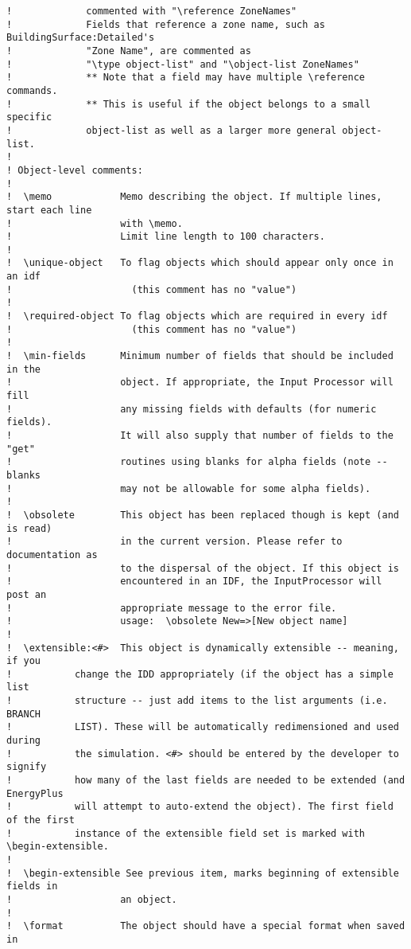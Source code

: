 \begin{lstlisting}
!             commented with "\reference ZoneNames"
!             Fields that reference a zone name, such as BuildingSurface:Detailed's
!             "Zone Name", are commented as
!             "\type object-list" and "\object-list ZoneNames"
!             ** Note that a field may have multiple \reference commands.
!             ** This is useful if the object belongs to a small specific
!             object-list as well as a larger more general object-list.
!
! Object-level comments:
!
!  \memo            Memo describing the object. If multiple lines, start each line
!                   with \memo.
!                   Limit line length to 100 characters.
!
!  \unique-object   To flag objects which should appear only once in an idf
!                     (this comment has no "value")
!
!  \required-object To flag objects which are required in every idf
!                     (this comment has no "value")
!
!  \min-fields      Minimum number of fields that should be included in the
!                   object. If appropriate, the Input Processor will fill
!                   any missing fields with defaults (for numeric fields).
!                   It will also supply that number of fields to the "get"
!                   routines using blanks for alpha fields (note -- blanks
!                   may not be allowable for some alpha fields).
!
!  \obsolete        This object has been replaced though is kept (and is read)
!                   in the current version. Please refer to documentation as
!                   to the dispersal of the object. If this object is
!                   encountered in an IDF, the InputProcessor will post an
!                   appropriate message to the error file.
!                   usage:  \obsolete New=>[New object name]
!
!  \extensible:<#>  This object is dynamically extensible -- meaning, if you
!           change the IDD appropriately (if the object has a simple list
!           structure -- just add items to the list arguments (i.e. BRANCH
!           LIST). These will be automatically redimensioned and used during
!           the simulation. <#> should be entered by the developer to signify
!           how many of the last fields are needed to be extended (and EnergyPlus
!           will attempt to auto-extend the object). The first field of the first
!           instance of the extensible field set is marked with \begin-extensible.
!
!  \begin-extensible See previous item, marks beginning of extensible fields in
!                   an object.
!
!  \format          The object should have a special format when saved in

\end{lstlisting}
